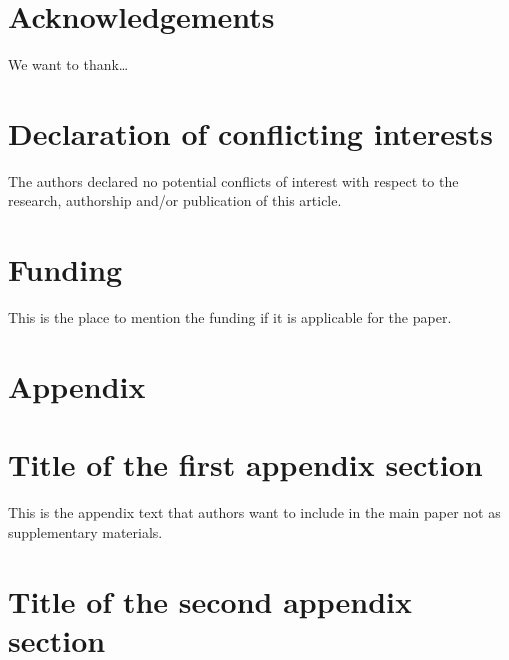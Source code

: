 \documentclass[submit]{smj}
\begin{document}
\section*{Acknowledgements}
We want to thank\ldots 


\section*{Declaration of conflicting interests}
The authors declared no potential conflicts of interest with respect to the research, authorship and/or
publication of this article.


\section*{Funding}
This is the place to mention the funding if it is applicable for the paper.


\appendix
\section*{Appendix}
\section{Title of the first appendix section}
This is the appendix text that authors want to include in the main paper not as supplementary materials.

\section{Title of the second appendix section}



\end{document}
